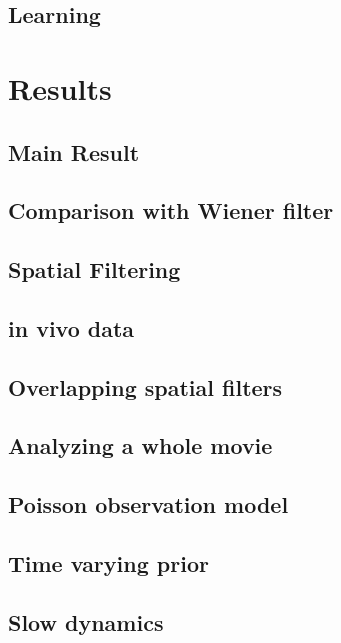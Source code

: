 \subsection{Learning} \label{sec:est}


\section{Results}

\clearpage\newpage
\subsection{Main Result}


\clearpage\newpage
\subsection{Comparison with Wiener filter}


\clearpage\newpage
\subsection{Spatial Filtering}


\clearpage\newpage
\subsection{in vivo data}


\clearpage\newpage
\subsection{Overlapping spatial filters}


\clearpage\newpage
\subsection{Analyzing a whole movie}


\subsection{Poisson observation model}

\subsection{Time varying prior}

\subsection{Slow dynamics}

